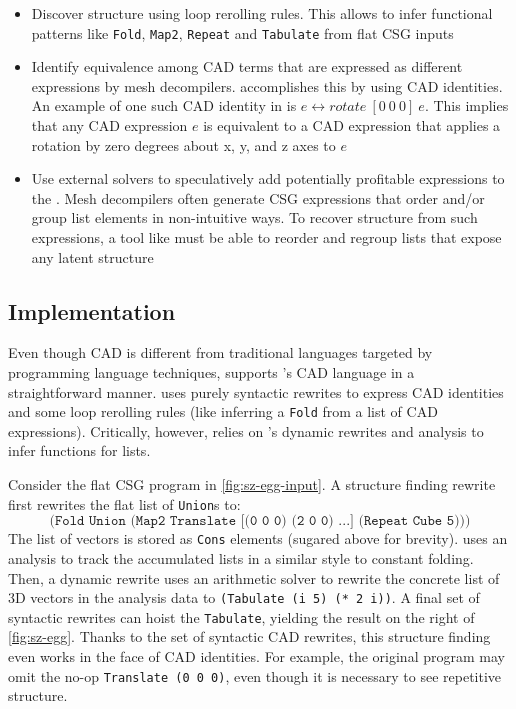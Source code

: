 \begin{itemize}

  \item Discover structure using loop rerolling rules.
    This allows \sz to infer functional patterns like
    \texttt{Fold}, \texttt{Map2}, \texttt{Repeat} and
    \texttt{Tabulate} from flat CSG inputs

  \item Identify equivalence among CAD terms that are
    expressed as different expressions by mesh decompilers.
    \sz accomplishes this by using CAD identities.
    An example of one such CAD identity in \sz is
    $e \leftrightarrow \mathit{rotate}~[0 ~ 0 ~ 0] ~ e$.
    This implies that any CAD expression $e$
    is equivalent to a CAD expression that applies
    a rotation by zero degrees about x, y, and z axes
    to $e$

  \item Use external solvers to
    speculatively add potentially profitable
    expressions to the \egraph.
    Mesh decompilers often generate CSG expressions
    that order and/or group list elements in
    non-intuitive ways.
    To recover structure from such expressions,
    a tool like \sz must be able to reorder and regroup
    lists that expose any latent structure

\end{itemize}

\subsection{Implementation}

Even though CAD is
  different from traditional languages
  targeted by programming language techniques,
  \egg supports \sz's CAD language in a straightforward manner.
\sz uses purely syntactic rewrites to express
  CAD identities and some loop rerolling rules
  (like inferring a \texttt{Fold} from a list of CAD expressions).
Critically, however, \sz relies on \egg's
  dynamic rewrites and \eclass analysis to infer functions
  for lists.

Consider the flat CSG program in \autoref{fig:sz-egg-input}.
A structure finding rewrite first rewrites the flat list of \texttt{Union}s to:
$$\texttt{(Fold Union (Map2 Translate [(0 0 0) (2 0 0) ...] (Repeat Cube 5)))}$$
The list of vectors is stored as \texttt{Cons} elements (sugared above for brevity).
\sz uses an \eclass analysis to track the accumulated lists in a similar style
  to constant folding.
Then, a dynamic rewrite uses an arithmetic solver to rewrite the concrete
  list of 3D vectors in the analysis data
  to \mbox{\texttt{(Tabulate (i 5) (* 2 i))}}.
A final set of syntactic rewrites can hoist the \texttt{Tabulate}, yielding the
  result on the right of \autoref{fig:sz-egg}.
Thanks to the set of syntactic CAD rewrites, this structure finding even works
  in the face of CAD identities.
For example, the original program may omit the no-op
  \texttt{Translate (0 0 0)}, even though it is necessary to see repetitive
  structure.

